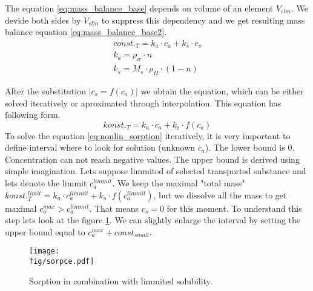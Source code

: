 The equation \ref{eq:mass_balance_base} depends on volume of an element $V_{elm}$. We devide both sides by $V_{elm}$ to suppress this dependency and we get resulting mass balance equation \ref{eq:mass_balance_base2}.
\begin{equation}
 \begin{array}{l}
  const._T = k_a\cdot c_a + k_s\cdot c_s\\
  k_a = \rho_w\cdot n\\
  k_s = M_s \cdot\rho_H\cdot(1-n)
 \end{array}
 \label{eq:mass_balance_base2}
\end{equation}

After the substitution $|c_s = f(c_a)|$ we obtain the equation, which can be either solved iteratively or aproximated through interpolation. This equation has following form.
\begin{equation}
 konst._T = k_a\cdot c_a + k_s\cdot f(c_a)
 \label{eq:nonlin_sorption}
\end{equation}
To solve the equation \ref{eq:nonlin_sorption} iteratively, it is very important to define interval where to look for solution (unknown $c_a$). The lower bound is $0$. Concentration can not reach negative values. The upper bound is derived using simple imagination. Lets suppose limmited  of selected transported substance and lets denote the limmit $c_a^{limmit}$. We keep the maximal "total mass" $konst._T^{limit}= k_a\cdot c_a^{limmit} + k_s\cdot f(c_a^{limmit})$, but we dissolve all the mass to get maximal $c_a^{max} > c_a^{limmit}$. That means $c_s = 0$ for this moment. To understand this step lets look at the figure \ref{fig:sorpce}. We can slightly enlarge the interval by setting the upper bound equal to $c_a^{max} + const_{small}$.

\begin{figure}[ht!]
 \centering
 \texttt{[image: \\fig/sorpce.pdf]}
 \caption{Sorption in combination with limmited solubility.}
 \label{fig:sorpce}
\end{figure}


